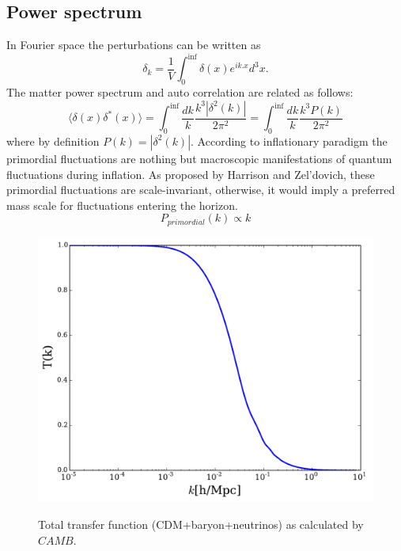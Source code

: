 \subsection{Power spectrum}
In Fourier space the perturbations can be written as 
\begin{equation}
\delta_{k} = \frac{1}{V} \int^{\inf}_{0} \delta(x) e^{ik.x} d^{3}x .
\end{equation}
The matter power spectrum and auto correlation are related as follows:
\begin{equation}
\langle \delta(x) \delta^{*}(x) \rangle = \int^{\inf}_{0} \frac{dk}{k} \frac{k^{3} |\delta^{2}(k)|}{2\pi^{2}} = \int^{\inf}_{0} \frac{dk}{k}\frac{k^{3} P(k)}{2\pi^{2}}
\end{equation}
where by definition $P(k) = |\delta^{2}(k)|$.
According to inflationary paradigm the primordial fluctuations are nothing but macroscopic manifestations of quantum fluctuations during inflation. 
As proposed by Harrison and Zel'dovich, these primordial fluctuations are scale-invariant, otherwise, it would imply a preferred mass scale for fluctuations entering the horizon.
\begin{equation}
P_{primordial}(k) \propto k
\end{equation}
\noindent%
\begin{figure}[H]
\includegraphics[width = \columnwidth]{figs/tf.pdf}
\label{tf}
\caption{Total transfer function (CDM+baryon+neutrinos) as calculated by $CAMB$.}
\end{figure}


